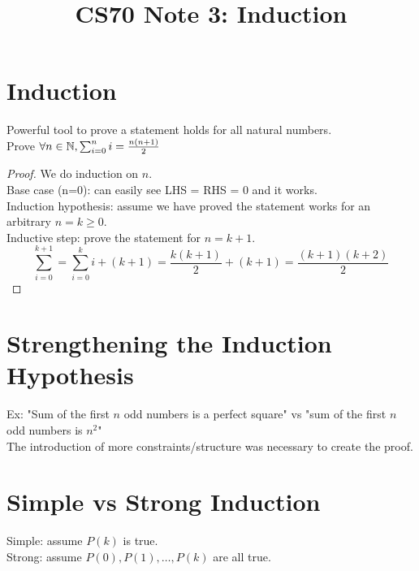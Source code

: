 \documentclass[12pt, letterpaper]{article}
\title{CS70 Note 3: Induction}
\begin{document}
\maketitle

\section{Induction}
Powerful tool to prove a statement holds for all natural numbers.
\\Prove $\forall n\in\mathbb{N},\sum_{i=0}^ni=\frac{n(n+1)}{2}$
\begin{proof} We do induction on $n$.
\\Base case (n=0): can easily see LHS = RHS = 0 and it works.
\\Induction hypothesis: assume we have proved the statement works for an arbitrary
$n=k\geq0$.
\\Inductive step: prove the statement for $n=k+1$.
$$\sum_{i=0}^{k+1}=\sum_{i=0}^ki+(k+1)=\frac{k(k+1)}{2}+(k+1)=\frac{(k+1)(k+2)}{2}$$
\end{proof}

\section{Strengthening the Induction Hypothesis}
Ex: "Sum of the first $n$ odd numbers is a perfect square"
vs
"sum of the first $n$ odd numbers is $n^2$"
\\The introduction of more constraints/structure was necessary
to create the proof.

\section{Simple vs Strong Induction}
Simple: assume $P(k)$ is true.
\\Strong: assume $P(0),P(1),\dots,P(k)$ are all true.
\end{document}
